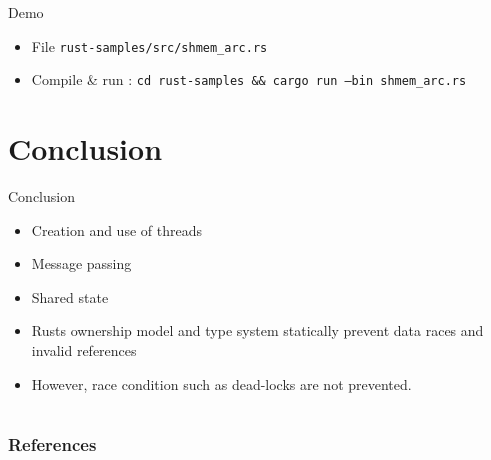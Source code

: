 \documentclass{beamer}
\begin{document}
\begin{frame}{Demo}
    \begin{itemize}
        \item File \texttt{rust-samples/src/shmem\_arc.rs}
        \item Compile \& run : \texttt{cd rust-samples \&\& cargo run --bin shmem\_arc.rs}
    \end{itemize}
\end{frame}

\section{Conclusion}
\begin{frame}{Conclusion}
    \begin{itemize}
        \item Creation and use of threads
        \item Message passing
        \item Shared state
        \item Rusts ownership model and type system statically prevent data races and invalid references
        \item However, race condition such as dead-locks are not prevented.
    \end{itemize}
\end{frame}

\section*{}
\begin{frame}[allowframebreaks]
    \frametitle{References}
    
    
\end{frame}
\end{document}
